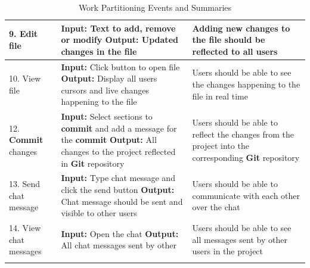 \documentclass[12pt, titlepage]{article}
\begin{document}
\begin{longtable}{|p{4cm}|p{5cm}|p{5cm}|}
		\hline
		9. Edit file  & \textbf{Input:} Text to add, remove or modify \newline \textbf{Output:} Updated changes in the file &  Adding new changes to the file should be reflected to all users\\
		\hline
		10. View file & \textbf{Input:} Click button to open file \newline \textbf{Output:} Display all users cursors and live changes happening to the file &  Users should be able to see the changes happening to the file in real time\\
		\hline
		12. \textbf{Commit} changes & \textbf{Input:} Select sections to \textbf{commit} and add a message for the \textbf{commit} \newline \textbf{Output:} All changes to the project reflected in \textbf{Git} repository &  Users should be able to reflect the changes from the project into the corresponding \textbf{Git} repository\\
		\hline
		13. Send chat message & \textbf{Input:} Type chat message and click the send button \newline \textbf{Output:} Chat message should be sent and visible to other users &  Users should be able to communicate with each other over the chat\\
		\hline
		14. View chat messages & \textbf{Input:} Open the chat \newline \textbf{Output:} All chat messages sent by other &  Users should be able to see all messages sent by other users in the project\\
		\hline
		\caption{Work Partitioning Events and Summaries}
	\end{longtable}
\end{document}
